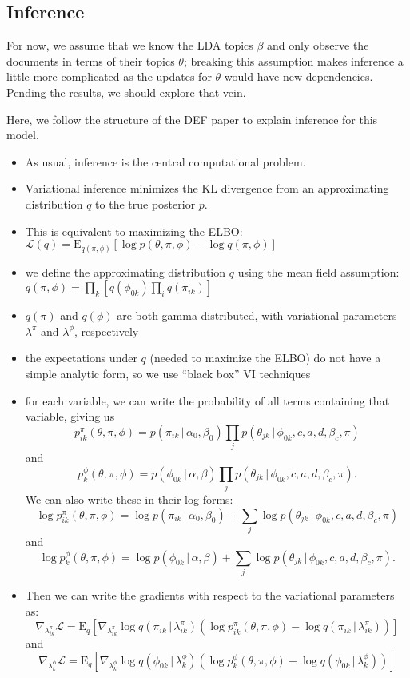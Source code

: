 \documentclass{article}
\newcommand{\E}{\mathrm{E}}
\newcommand{\g}{\, | \,}
\begin{document}
\subsection{Inference}
For now, we assume that we know the LDA topics $\beta$ and only observe the documents in terms of their topics $\theta$; breaking this assumption makes inference a little more complicated as the updates for $\theta$ would have new dependencies.  Pending the results, we should explore that vein. 

Here, we follow the structure of the DEF paper to explain inference for this model.

\begin{itemize}
\item As usual, inference is the central computational problem.
\item Variational inference minimizes the KL divergence from an approximating distribution $q$ to the true posterior $p$.
\item This is equivalent to maximizing the ELBO: $\mathcal{L}(q)  = \E_{q(\pi, \phi)}[\log p(\theta,\pi,\phi) - \log q(\pi, \phi)]$
\item we define the approximating distribution $q$ using the mean field assumption: $q(\pi, \phi) = \prod_k\left[q(\phi_{0k})\prod_i q(\pi_{ik})\right]$ 
\item $q(\pi)$ and $q(\phi)$ are both gamma-distributed, with variational parameters $\lambda^\pi$ and $\lambda^\phi$, respectively
\item the expectations under $q$ (needed to maximize the ELBO) do not have a simple analytic form, so we use ``black box'' VI techniques
\item for each variable, we can write the probability of all terms containing that variable, giving us 
\[p^\pi_{ik}(\theta, \pi, \phi) = p(\pi_{ik} \g \alpha_0, \beta_0) \prod_j p(\theta_{jk} \g \phi_{0k}, c, a, d, \beta_c, \pi)\]
and
\[p^\phi_{k}(\theta, \pi, \phi) = p(\phi_{0k} \g \alpha, \beta) \prod_j p(\theta_{jk} \g \phi_{0k}, c, a, d, \beta_c, \pi).\]
We can also write these in their log forms:
\[\log p^\pi_{ik}(\theta, \pi, \phi) = \log p(\pi_{ik} \g \alpha_0, \beta_0) + \sum_j \log p(\theta_{jk} \g \phi_{0k}, c, a, d, \beta_c, \pi)\]
and
\[\log p^\phi_{k}(\theta, \pi, \phi) = \log p(\phi_{0k} \g \alpha, \beta) + \sum_j \log p(\theta_{jk} \g \phi_{0k}, c, a, d, \beta_c, \pi).\]
\item Then we can write the gradients with respect to the variational parameters as: \[\nabla_{\lambda^\pi_{ik}} \mathcal{L} = \E_q \left[ \nabla_{\lambda^\pi_{ik}} \log q(\pi_{ik} \g \lambda^\pi_{ik}) \left( \log p^\pi_{ik}(\theta, \pi, \phi) - \log q(\pi_{ik} \g \lambda^\pi_{ik}) \right)\right]\] and \[\nabla_{\lambda^\phi_{k}} \mathcal{L} = \E_q \left[ \nabla_{\lambda^\phi_{k}} \log q(\phi_{0k} \g \lambda^\phi_{k}) \left( \log p^\phi_{k}(\theta, \pi, \phi) - \log q(\phi_{0k} \g \lambda^\phi_{k}) \right)\right]\]
\end{itemize}
\end{document}
